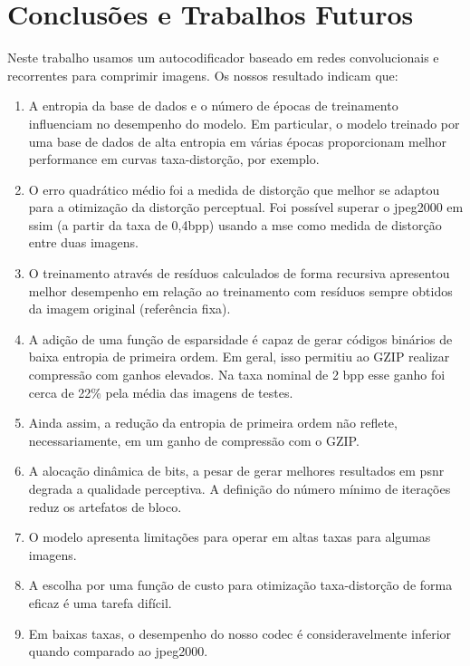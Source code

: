 \chapter{Conclusões e Trabalhos Futuros}

Neste trabalho usamos um autocodificador baseado em redes convolucionais e recorrentes para comprimir imagens. Os nossos resultado indicam que:
\begin{enumerate}
	\item A entropia da base de dados e o número de épocas de treinamento influenciam no desempenho do modelo. Em particular, o modelo treinado por uma base de dados de alta entropia em várias épocas proporcionam melhor performance em curvas taxa-distorção, por exemplo.  
	\item O erro quadrático médio foi a medida de distorção que melhor se adaptou para a otimização da distorção perceptual. Foi possível superar o \acrshort{jpeg}2000 em \acrshort{ssim} (a partir da taxa de 0,4bpp) usando a \acrshort{mse} como medida de distorção entre duas imagens. 
	\item O treinamento através de resíduos calculados de forma recursiva apresentou melhor desempenho em relação ao treinamento com resíduos sempre obtidos da imagem original (referência fixa).
	\item A adição de uma função de esparsidade é capaz de gerar códigos binários de baixa entropia de primeira ordem. Em geral, isso permitiu ao GZIP realizar compressão com ganhos elevados. Na taxa nominal de 2 bpp esse ganho foi cerca de 22\% pela média das imagens de testes.
	\item Ainda assim, a redução da entropia de primeira ordem não reflete, necessariamente, em um ganho de compressão com o GZIP.		
	\item A alocação dinâmica de bits, a pesar de gerar melhores resultados em \acrshort{psnr} degrada a qualidade perceptiva. A definição do número mínimo de iterações reduz os artefatos de bloco.   
	\item O modelo apresenta limitações para operar em altas taxas para algumas imagens.
	\item A escolha por uma função de custo para otimização taxa-distorção de forma eficaz é uma tarefa difícil.
	\item Em baixas taxas, o desempenho do nosso \acrshort{codec} é consideravelmente inferior quando comparado ao \acrshort{jpeg}2000.        
	
\end{enumerate} 

